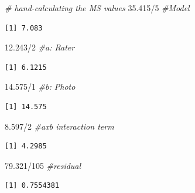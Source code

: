 \documentclass[
  11pt,
]{book}
\newenvironment{Shaded}{\begin{snugshade}}{\end{snugshade}}
\newcommand{\CommentTok}[1]{\textcolor[rgb]{0.56,0.35,0.01}{\textit{#1}}}
\newcommand{\DecValTok}[1]{\textcolor[rgb]{0.00,0.00,0.81}{#1}}
\newcommand{\FloatTok}[1]{\textcolor[rgb]{0.00,0.00,0.81}{#1}}
\newcommand{\SpecialCharTok}[1]{\textcolor[rgb]{0.00,0.00,0.00}{#1}}
\begin{document}
\begin{Shaded}
\begin{Highlighting}[]
\CommentTok{\# hand{-}calculating the MS values}
\FloatTok{35.415}\SpecialCharTok{/}\DecValTok{5}  \CommentTok{\#Model}
\end{Highlighting}
\end{Shaded}

\begin{verbatim}
[1] 7.083
\end{verbatim}

\begin{Shaded}
\begin{Highlighting}[]
\FloatTok{12.243}\SpecialCharTok{/}\DecValTok{2}  \CommentTok{\#a: Rater}
\end{Highlighting}
\end{Shaded}

\begin{verbatim}
[1] 6.1215
\end{verbatim}

\begin{Shaded}
\begin{Highlighting}[]
\FloatTok{14.575}\SpecialCharTok{/}\DecValTok{1}  \CommentTok{\#b:  Photo}
\end{Highlighting}
\end{Shaded}

\begin{verbatim}
[1] 14.575
\end{verbatim}

\begin{Shaded}
\begin{Highlighting}[]
\FloatTok{8.597}\SpecialCharTok{/}\DecValTok{2}  \CommentTok{\#axb interaction term}
\end{Highlighting}
\end{Shaded}

\begin{verbatim}
[1] 4.2985
\end{verbatim}

\begin{Shaded}
\begin{Highlighting}[]
\FloatTok{79.321}\SpecialCharTok{/}\DecValTok{105}  \CommentTok{\#residual}
\end{Highlighting}
\end{Shaded}

\begin{verbatim}
[1] 0.7554381
\end{verbatim}
\end{document}
